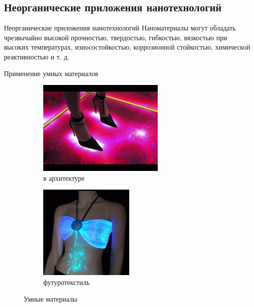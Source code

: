 \documentclass[_Venture_p3.tex]{subfiles}
\begin{document}
\subsection{Неорганические приложения нанотехнологий}
\begin{frame}{Неорганические приложения нанотехнологий}
Наноматериалы могут обладать чрезвычайно высокой прочностью, твердостью, гибкостью, вязкостью при высоких температурах, износостойкостью, коррозионной стойкостью, химической реактивностью и т. д.
\end{frame}

\begin{frame}{Применение умных материалов}
\begin{figure}	
	\centering
	\begin{subfigure}[t]{4.2cm}
		\centering
		\includegraphics[scale=.95]{img/smart_materials_a.png}
		\caption{в архитектуре}\label{fig:a}	
	\end{subfigure}
	\quad
	\begin{subfigure}[t]{4.2cm}
		\centering
		\includegraphics[scale=.95]{img/smart_materials_b.png}
		\caption{футуротекстиль}\label{fig:b}
	\end{subfigure}
	\caption{Умные материалы}\label{fig:smart_materials1}
\end{figure}
\end{frame}
\end{document}
